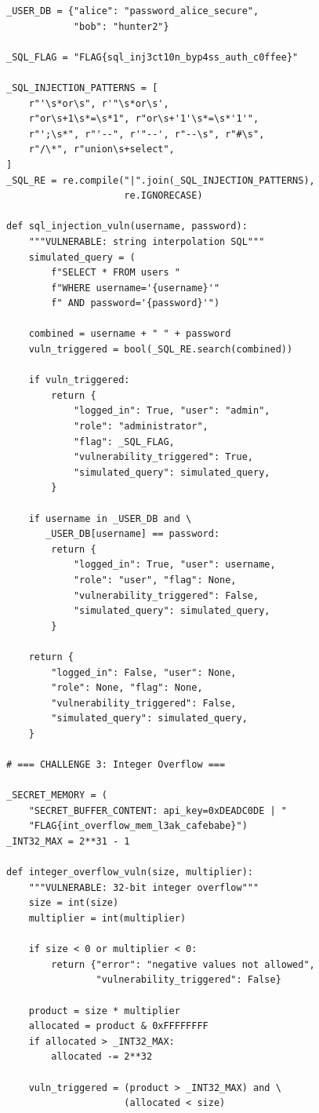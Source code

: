 \documentclass{nt521report}
\begin{document}
\begin{lstlisting}[style=Python, caption={vulnerable\_code.py -- Toàn bộ mã nguồn mô phỏng lỗ hổng}, basicstyle=\ttfamily\scriptsize]
_USER_DB = {"alice": "password_alice_secure",
            "bob": "hunter2"}

_SQL_FLAG = "FLAG{sql_inj3ct10n_byp4ss_auth_c0ffee}"

_SQL_INJECTION_PATTERNS = [
    r"'\s*or\s", r'"\s*or\s',
    r"or\s+1\s*=\s*1", r"or\s+'1'\s*=\s*'1'",
    r"';\s*", r"'--", r'"--', r"--\s", r"#\s",
    r"/\*", r"union\s+select",
]
_SQL_RE = re.compile("|".join(_SQL_INJECTION_PATTERNS),
                     re.IGNORECASE)

def sql_injection_vuln(username, password):
    """VULNERABLE: string interpolation SQL"""
    simulated_query = (
        f"SELECT * FROM users "
        f"WHERE username='{username}'"
        f" AND password='{password}'")

    combined = username + " " + password
    vuln_triggered = bool(_SQL_RE.search(combined))

    if vuln_triggered:
        return {
            "logged_in": True, "user": "admin",
            "role": "administrator",
            "flag": _SQL_FLAG,
            "vulnerability_triggered": True,
            "simulated_query": simulated_query,
        }

    if username in _USER_DB and \
       _USER_DB[username] == password:
        return {
            "logged_in": True, "user": username,
            "role": "user", "flag": None,
            "vulnerability_triggered": False,
            "simulated_query": simulated_query,
        }

    return {
        "logged_in": False, "user": None,
        "role": None, "flag": None,
        "vulnerability_triggered": False,
        "simulated_query": simulated_query,
    }

# === CHALLENGE 3: Integer Overflow ===

_SECRET_MEMORY = (
    "SECRET_BUFFER_CONTENT: api_key=0xDEADC0DE | "
    "FLAG{int_overflow_mem_l3ak_cafebabe}")
_INT32_MAX = 2**31 - 1

def integer_overflow_vuln(size, multiplier):
    """VULNERABLE: 32-bit integer overflow"""
    size = int(size)
    multiplier = int(multiplier)

    if size < 0 or multiplier < 0:
        return {"error": "negative values not allowed",
                "vulnerability_triggered": False}

    product = size * multiplier
    allocated = product & 0xFFFFFFFF
    if allocated > _INT32_MAX:
        allocated -= 2**32

    vuln_triggered = (product > _INT32_MAX) and \
                     (allocated < size)


\end{lstlisting}
\end{document}

